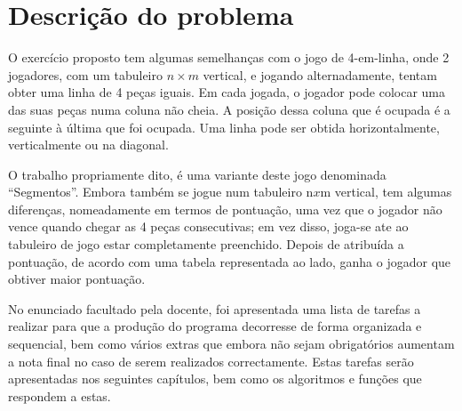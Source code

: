 \documentclass[a4paper,titlepage]{scrreprt}
\begin{document}
\chapter{Descrição do problema}
O exercício proposto tem algumas semelhanças com o jogo de 4-em-linha, onde 2 jogadores, com um tabuleiro $n\times m$ vertical, e
jogando alternadamente, tentam obter uma linha de 4 peças iguais. Em cada jogada, o jogador pode colocar uma das suas peças
numa coluna não cheia. A posição dessa coluna que é ocupada é a seguinte à última que foi ocupada. Uma linha pode ser obtida
horizontalmente, verticalmente ou na diagonal.

O trabalho propriamente dito, é uma variante deste jogo denominada ``Segmentos''. Embora também se jogue num tabuleiro n$x$m
vertical, tem algumas diferenças, nomeadamente em termos de pontuação, uma vez que o jogador não vence quando chegar as 4 peças
consecutivas; em vez disso, joga-se ate ao tabuleiro de jogo estar completamente preenchido. Depois de atribuída a pontuação, de
acordo com uma tabela representada ao lado, ganha o jogador que obtiver maior pontuação.

No enunciado facultado pela docente, foi apresentada uma lista de tarefas a realizar para que a produção do programa decorresse
de forma organizada e sequencial, bem como vários extras que embora não sejam obrigatórios aumentam a nota final no caso de
serem realizados correctamente. Estas tarefas serão apresentadas nos seguintes capítulos, bem como os algoritmos e funções que
respondem a estas.
\end{document}
